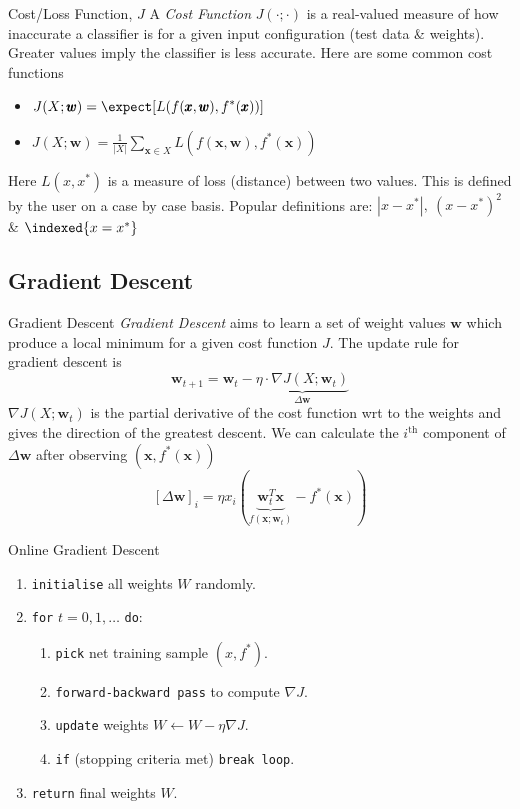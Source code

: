 \documentclass[11pt,a4paper]{article}
\begin{document}
  \begin{definition}{Cost/Loss Function, $J$}
    A \textit{Cost Function} $J(\cdot;\cdot)$ is a real-valued measure of how inaccurate a classifier is for a given input configuration (test data \& weights). Greater values imply the classifier is less accurate. Here are some common cost functions
    \begin{itemize}
      \item[Expected Loss] $\displaystyle J(X;\pmb{w})=\expect[L(f(\pmb{x},\pmb{w}),f^*(\pmb{x}))]$
      \item[Empirical Risk] $\displaystyle J(X;\pmb{w})=\frac1{|X|}\sum_{\pmb{x}\in X}L(f(\pmb{x},\pmb{w}),f^*(\pmb{x}))$
    \end{itemize}
    Here $L(x,x^*)$ is a measure of loss (distance) between two values. This is defined by the user on a case by case basis. Popular definitions are: $|x-x^*|,\ (x-x^*)^2$ \& $\indexed\{x=x^*\}$
  \end{definition}

\subsection{Gradient Descent}

  \begin{definition}{Gradient Descent}
    \textit{Gradient Descent} aims to learn a set of weight values $\pmb{w}$ which produce a local minimum for a given cost function $J$. The update rule for gradient descent is
    \[ \pmb{w}_{t+1}=\pmb{w}_t-\underbrace{\eta\cdot\nabla J(X;\pmb{w}_t)}_{\Delta\pmb{w}} \]
    $\nabla J(X;\pmb{w}_t)$ is the partial derivative of the cost function wrt to the weights and gives the direction of the greatest descent. We can calculate the $i^\text{th}$ component of $\Delta\pmb{w}$ after observing $(\pmb{x},f^*(\pmb{x}))$
    \[ [\Delta\pmb{w}]_i=\eta x_i(\underbrace{\pmb{w}^T_t\pmb{x}}_{f(\pmb{x};\pmb{w}_t)}-f^*(\pmb{x})) \]
  \end{definition}

  \begin{definition}{Online Gradient Descent}
    \begin{enumerate}
      \item \texttt{initialise} all weights $W$ randomly.
      \item \texttt{for} $t=0,1,\dots$ \texttt{do}:
      \begin{enumerate}
        \item \texttt{pick} net training sample $(x,f^*)$.
        \item \texttt{forward-backward pass} to compute $\nabla J$.
        \item \texttt{update} weights $W\leftarrow W-\eta\nabla J$.
        \item \texttt{if} (stopping criteria met) \texttt{break loop}.
      \end{enumerate}
      \item \texttt{return} final weights $W$.
    \end{enumerate}
  \end{definition}
\end{document}
